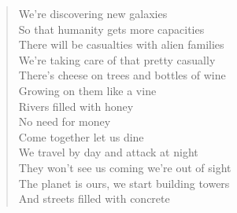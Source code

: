\begin{verse}
We're discovering new galaxies \\ 
So that humanity gets more capacities \\ 
There will be casualties with alien families  \\ 
We're taking care of that pretty casually \\ 
There's cheese on trees and bottles of wine \\ 
Growing on them like a vine \\ 
Rivers filled with honey \\ 
No need for money \\ 
Come together let us dine \\ 

We travel by day and attack at night \\ 
They won't see us coming we're out of sight \\ 
The planet is ours, we start building towers \\ 
And streets filled with concrete
\end{verse}

\clearpage
